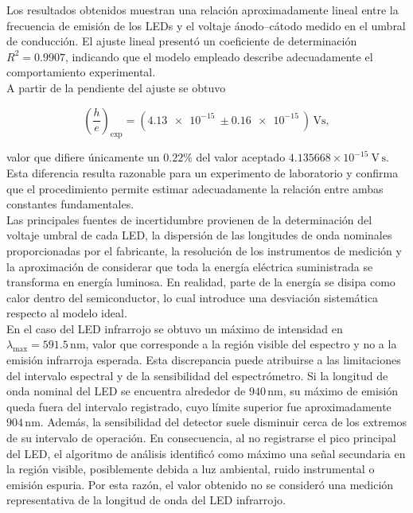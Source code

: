 Los resultados obtenidos muestran una relación aproximadamente lineal entre la
frecuencia de emisión de los LEDs y el voltaje ánodo--cátodo medido en el umbral
de conducción. El ajuste lineal presentó un coeficiente de determinación
$R^2=0.9907$, indicando que el modelo empleado describe adecuadamente el
comportamiento experimental.\\

A partir de la pendiente del ajuste se obtuvo

\[
\left(\frac{h}{e}\right)_{\mathrm{exp}}
=\left(
\SI{4.13e-15}{} \pm \SI{0.16e-15}{}
\right)\,\si{\volt\second},
\]

valor que difiere únicamente un $0.22\%$ del valor aceptado
$4.135668\times10^{-15}\ \mathrm{V\,s}$. Esta diferencia resulta razonable para
un experimento de laboratorio y confirma que el procedimiento permite estimar
adecuadamente la relación entre ambas constantes fundamentales.\\

Las principales fuentes de incertidumbre provienen de la determinación del
voltaje umbral de cada LED, la dispersión de las longitudes de onda nominales
proporcionadas por el fabricante, la resolución de los instrumentos de medición
y la aproximación de considerar que toda la energía eléctrica suministrada se
transforma en energía luminosa. En realidad, parte de la energía se disipa como
calor dentro del semiconductor, lo cual introduce una desviación sistemática
respecto al modelo ideal.\\

En el caso del LED infrarrojo se obtuvo un máximo de intensidad en
$\lambda_{\max}=591.5\,\mathrm{nm}$, valor que corresponde a la región
visible del espectro y no a la emisión infrarroja esperada. Esta
discrepancia puede atribuirse a las limitaciones del intervalo espectral
y de la sensibilidad del espectrómetro. Si la longitud de onda nominal
del LED se encuentra alrededor de $940\,\mathrm{nm}$, su máximo de
emisión queda fuera del intervalo registrado, cuyo límite superior fue
aproximadamente $904\,\mathrm{nm}$. Además, la sensibilidad del detector
suele disminuir cerca de los extremos de su intervalo de operación. En
consecuencia, al no registrarse el pico principal del LED, el algoritmo
de análisis identificó como máximo una señal secundaria en la región
visible, posiblemente debida a luz ambiental, ruido instrumental o
emisión espuria. Por esta razón, el valor obtenido no se consideró una
medición representativa de la longitud de onda del LED infrarrojo.\\




